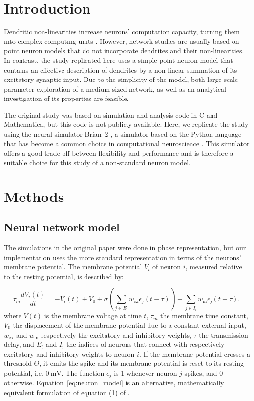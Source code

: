 \documentclass[10pt,a4paper,onecolumn]{article}
\begin{document}
\section*{Introduction}
Dendritic non-linearities increase neurons' computation capacity, turning them into complex computing units \cite{Poirazi2003a}. However, network studies are usually based on point neuron models that do not incorporate dendrites and their non-linearities. In contrast, the study replicated here \cite{Memmesheimer2012} uses a simple point-neuron model that contains an effective description of dendrites by a non-linear summation of its excitatory synaptic input. Due to the simplicity of the model, both large-scale parameter exploration of a medium-sized network, as well as an analytical investigation of its properties are feasible.

The original study was based on simulation and analysis code in C and Mathematica, but this code is not publicly available. Here, we replicate the study using the neural simulator Brian~2 \cite{Goodman2009,Stimberg2014}, a simulator based on the Python language that has become a common choice in computational neuroscience \cite{Muller2015}. This simulator offers a good trade-off between flexibility and performance and is therefore a suitable choice for this study of a non-standard neuron model.

\section*{Methods}
\subsection*{Neural network model}
The simulations in the original paper were done in phase representation, but our implementation uses the more standard representation in terms of the neurons' membrane potential. The membrane potential $V_i$ of neuron $i$, measured relative to the resting potential, is described by:

\begin{equation}
\label{eq:neuron_model}
\tau_m \frac{dV_i(t)}{dt} = - V_i(t) + V_0 + \sigma \left( \sum_{j\in E_i} w_\text{ex} \epsilon_{j}(t-\tau) \right) - \sum_{j \in I_i} w_\text{in}\epsilon_{j}(t-\tau),
\end{equation}
where $V(t)$ is the membrane voltage at time $t$, $\tau_m$ the membrane time constant, $V_0$ the displacement of the membrane potential due to a constant external input, $w_\text{ex}$ and $w_\text{in}$ respectively the excitatory and inhibitory weights, $\tau$ the transmission delay, and $E_i$ and $I_i$ the indices of neurons that connect with respectively excitatory and inhibitory weights to neuron $i$. If the membrane potential crosses a threshold $\Theta$, it emits the spike and its membrane potential is reset to its resting potential, i.e. $\SI{0}{\milli\volt}$. The function $\epsilon_{j}$ is 1 whenever neuron $j$ spikes, and 0 otherwise. Equation~\ref{eq:neuron_model} is an alternative, mathematically equivalent formulation of equation (1) of \cite{Memmesheimer2012}.
\end{document}
